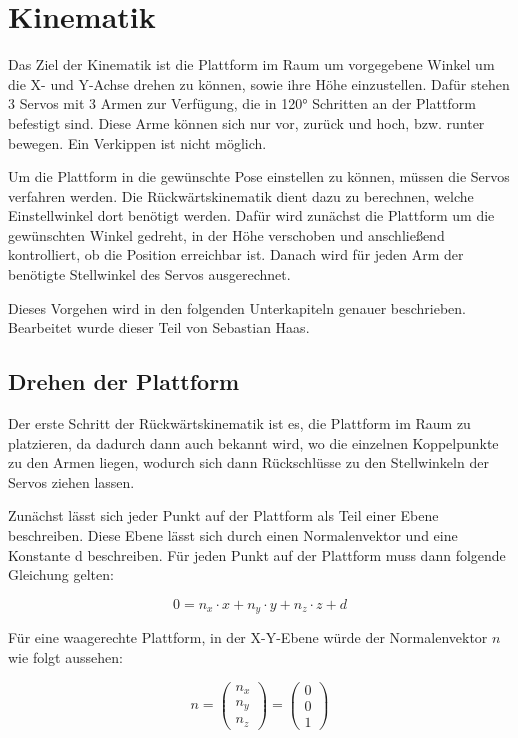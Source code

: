 \documentclass[11pt, a4paper]{scrreprt}
\begin{document}
\chapter{Kinematik}

Das Ziel der Kinematik ist die Plattform im Raum um vorgegebene Winkel um die X- und Y-Achse
drehen zu können, sowie ihre Höhe einzustellen. Dafür stehen 3 Servos mit 3 Armen zur
Verfügung, die in 120° Schritten an der Plattform befestigt sind. Diese Arme können sich nur vor,
zurück und hoch, bzw. runter bewegen. Ein Verkippen ist nicht möglich.

Um die Plattform in die gewünschte Pose einstellen zu können, müssen die Servos verfahren
werden. Die Rückwärtskinematik dient dazu zu berechnen, welche Einstellwinkel dort benötigt
werden. Dafür wird zunächst die Plattform um die gewünschten Winkel gedreht, in der Höhe
verschoben und anschließend kontrolliert, ob die Position erreichbar ist. Danach wird für jeden
Arm der benötigte Stellwinkel des Servos ausgerechnet.

Dieses Vorgehen wird in den folgenden Unterkapiteln genauer beschrieben. Bearbeitet wurde
dieser Teil von Sebastian Haas.

\section{Drehen der Plattform}

Der erste Schritt der Rückwärtskinematik ist es, die Plattform im Raum zu platzieren, da dadurch
dann auch bekannt wird, wo die einzelnen Koppelpunkte zu den Armen liegen, wodurch sich dann
Rückschlüsse zu den Stellwinkeln der Servos ziehen lassen.

Zunächst lässt sich jeder Punkt auf der Plattform als Teil einer Ebene beschreiben. Diese Ebene
lässt sich durch einen Normalenvektor und eine Konstante d beschreiben. Für jeden Punkt auf der
Plattform muss dann folgende Gleichung gelten:

\[
  0 = n_x \cdot x + n_y \cdot y + n_z \cdot z + d
\]

Für eine waagerechte Plattform, in der X-Y-Ebene würde der Normalenvektor $n$ wie folgt aussehen:

\[
  n = \begin{pmatrix} n_x \\ n_y \\ n_z \end{pmatrix} = \begin{pmatrix} 0 \\ 0 \\ 1 \end{pmatrix}
\]
\end{document}
